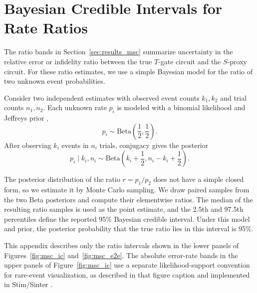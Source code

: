 \documentclass[a4paper, onecolumn, unpublished]{quantumarticle}
\begin{document}
	\section{Bayesian Credible Intervals for Rate Ratios}
    \label{app:intervals}

    The ratio bands in Section~\ref{sec:results_msc} summarize uncertainty in the relative error or infidelity ratio between the true $T$-gate circuit and the $S$-proxy circuit. For these ratio estimates, we use a simple Bayesian model for the ratio of two unknown event probabilities.

    Consider two independent estimates with observed event counts $k_1,k_2$ and trial counts $n_1,n_2$. Each unknown rate $p_i$ is modeled with a binomial likelihood and Jeffreys prior \cite{jeffreys1946invariant, lee2012bayesian},
    \begin{equation}
        p_i \sim \mathrm{Beta}\left(\frac{1}{2},\frac{1}{2}\right).
    \end{equation}
    After observing $k_i$ events in $n_i$ trials, conjugacy gives the posterior
    \begin{equation}
        p_i \mid k_i,n_i
        \sim
        \mathrm{Beta}
        \left(
            k_i + \frac{1}{2},
            n_i - k_i + \frac{1}{2}
        \right).
    \end{equation}

    The posterior distribution of the ratio $r=p_1/p_2$ does not have a simple closed form, so we estimate it by Monte Carlo sampling. We draw paired samples from the two Beta posteriors and compute their elementwise ratios. The median of the resulting ratio samples is used as the point estimate, and the 2.5th and 97.5th percentiles define the reported 95\% Bayesian credible interval. Under this model and prior, the posterior probability that the true ratio lies in this interval is 95\%.

    This appendix describes only the ratio intervals shown in the lower panels of Figures~\ref{fig:msc_ic} and~\ref{fig:msc_e2e}. The absolute error-rate bands in the upper panels of Figure~\ref{fig:msc_ic} use a separate likelihood-support convention for rare-event visualization, as described in that figure caption and implemented in Stim/Sinter \cite{gidneyStimFastStabilizer2021}.
\end{document}

